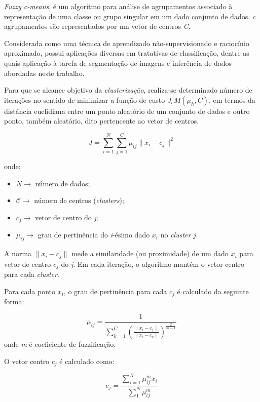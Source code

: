 \documentclass[12pt,a4paper]{article}
\numberwithin{equation}{section}
\begin{document}
\textit{Fuzzy c-means}, é um algoritmo para análise de agrupamentos associado à representação de uma classe ou grupo singular em um dado conjunto de dados. \textit{c} agrupamentos são representados por um vetor de centros \textit{C}.

Considerada como uma técnica de aprendizado não-supervisionado e raciocínio aproximado, possui aplicações diversas em tratativas de classificação, dentre as quais aplicação à tarefa de segmentação de imagens e inferência de dados abordadas neste trabalho.

Para que se alcance objetivo da \textit{clusterização}, realiza-se determinado número de iterações no sentido de minimizar a função de custo $J_{c}M(\mu_{h},C)$, em termos da distância euclidiana entre um ponto aleatório de um conjunto de dados e outro ponto, também aleatório, dito pertencente ao vetor de centros. 

\begin{equation}
J=\sum_{i=1}^{N}\sum_{j=1}^{C}\mu_{ij}\lVert x_{i}-c_{j} \rVert^2
\end{equation}

onde:
\begin{itemize}
	\item $N\longrightarrow$ número de dados;
	\item $\mathcal{C}\longrightarrow$ número de centros (\textit{clusters});
	\item $c_{j}\longrightarrow$ vetor de centro do \textit{j};
	\item $\mu_{ij}\longrightarrow$ grau de pertinência do \textit{i}-ésimo dado $x_{i}$ no \textit{cluster} $j$.
\end{itemize}

A norma $\lVert x_{i}-c_{j} \rVert$ mede a similaridade (ou proximidade) de um dado $x_{i}$ para vetor de centro $c_{j}$ do \textit{j}. Em cada iteração, o algoritmo mantém o vetor centro para cada \textit{cluster}. 

Para cada ponto $x_{i}$, o grau de pertinência para cada $c_{j}$ é calculado da seguinte forma:

\begin{equation}
\mu_{ij}=\frac{1}{\sum_{k=1}^{C}(\frac{\lVert x_{i}-c_{j} \rVert}{\lVert x_{i}-c_{k} \rVert})^\frac{2}{m-1}}
\end{equation}
onde \textit{m} é coeficiente de fuzzificação.

O vetor centro $c_{j}$ é calculado como:

\begin{equation}
c_{j}=\frac{\sum_{i=1}^{N}\mu_{ij}^m x_{i}}{\sum_{1}^{N}\mu_{ij}^m}
\end{equation}
\end{document}
